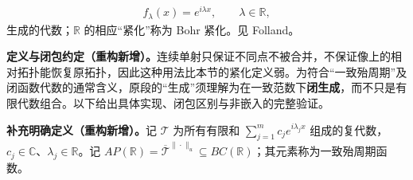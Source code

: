 \documentclass[../../main.tex]{subfiles}
\begin{document}
\begin{align*}
f_\lambda(x)=e^{i\lambda x},\qquad\lambda\in\mathbb R,
\end{align*}
生成的代数；$\mathbb R$ 的相应“紧化”称为 Bohr 紧化。见 Folland\cite[\S4.7]{folland-bib-047}。
\begin{remark}
\textbf{定义与闭包约定（重构新增）。}连续单射只保证不同点不被合并，不保证像上的相对拓扑能恢复原拓扑，因此这种用法比本节的紧化定义弱。为符合“一致殆周期”及闭函数代数的通常含义，原段的“生成”须理解为在一致范数下\textbf{闭生成}，而不只是有限代数组合。以下给出具体实现、闭包区别与非嵌入的完整验证。
\end{remark}
\begin{definition*}[本例的一致殆周期代数]\label{definition:ch04-uniform-almost-periodic}
\textbf{补充明确定义（重构新增）。}记 $\mathcal T$ 为所有有限和 $\sum_{j=1}^m c_j e^{i\lambda_jx}$ 组成的复代数，$c_j\in\mathbb C$、$\lambda_j\in\mathbb R$。记 $AP(\mathbb R)=\overline{\mathcal T}^{\|\cdot\|_u}\subseteq BC(\mathbb R)$；其元素称为一致殆周期函数。
\end{definition*}
\end{document}
